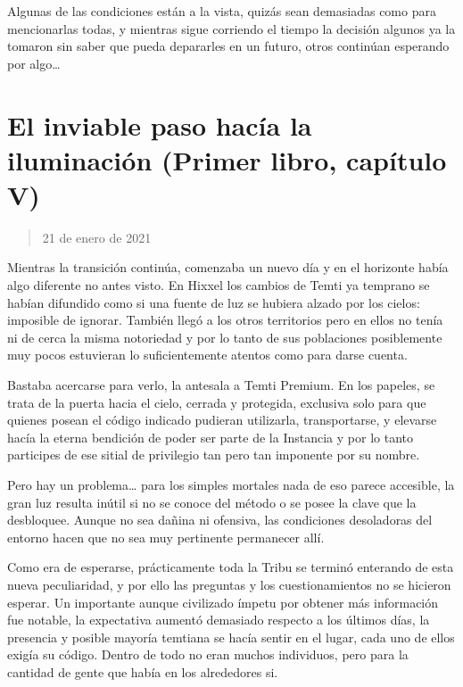 \documentclass[
  spanish,
]{book}
\begin{document}
Algunas de las condiciones están a la vista, quizás sean demasiadas como para mencionarlas todas, y mientras sigue corriendo el tiempo la decisión algunos ya la tomaron sin saber que pueda depararles en un futuro, otros continúan esperando por algo\ldots{}

\hypertarget{el-inviable-paso-hacuxeda-la-iluminaciuxf3n-primer-libro-capuxedtulo-v}{%
\section{El inviable paso hacía la iluminación (Primer libro, capítulo V)}\label{el-inviable-paso-hacuxeda-la-iluminaciuxf3n-primer-libro-capuxedtulo-v}}

\begin{quote}
21 de enero de 2021
\end{quote}

Mientras la transición continúa, comenzaba un nuevo día y en el horizonte había algo diferente no antes visto. En Hixxel los cambios de Temti ya temprano se habían difundido como si una fuente de luz se hubiera alzado por los cielos: imposible de ignorar. También llegó a los otros territorios pero en ellos no tenía ni de cerca la misma notoriedad y por lo tanto de sus poblaciones posiblemente muy pocos estuvieran lo suficientemente atentos como para darse cuenta.

Bastaba acercarse para verlo, la antesala a Temti Premium. En los papeles, se trata de la puerta hacia el cielo, cerrada y protegida, exclusiva solo para que quienes posean el código indicado pudieran utilizarla, transportarse, y elevarse hacía la eterna bendición de poder ser parte de la Instancia y por lo tanto participes de ese sitial de privilegio tan pero tan imponente por su nombre.

Pero hay un problema\ldots{} para los simples mortales nada de eso parece accesible, la gran luz resulta inútil si no se conoce del método o se posee la clave que la desbloquee. Aunque no sea dañina ni ofensiva, las condiciones desoladoras del entorno hacen que no sea muy pertinente permanecer allí.

Como era de esperarse, prácticamente toda la Tribu se terminó enterando de esta nueva peculiaridad, y por ello las preguntas y los cuestionamientos no se hicieron esperar. Un importante aunque civilizado ímpetu por obtener más información fue notable, la expectativa aumentó demasiado respecto a los últimos días, la presencia y posible mayoría temtiana se hacía sentir en el lugar, cada uno de ellos exigía su código. Dentro de todo no eran muchos individuos, pero para la cantidad de gente que había en los alrededores si.
\end{document}
